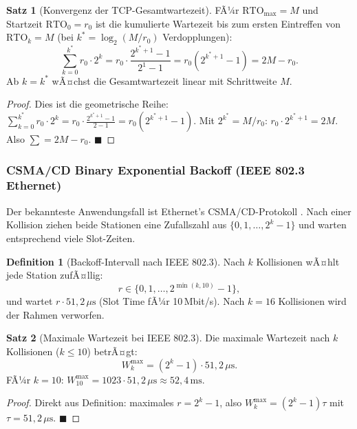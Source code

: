 ﻿\documentclass[a4paper,12pt]{article}
\theoremstyle{definition}
\newtheorem{definition}{Definition}
\newtheorem{satz}{Satz}
\begin{document}
\begin{satz}[Konvergenz der TCP-Gesamtwartezeit]
\label{satz:tcp_konvergenz}
FÃ¼r $\mathrm{RTO}_{\max} = M$ und Startzeit $\mathrm{RTO}_0 = r_0$
ist die kumulierte Wartezeit bis zum ersten Eintreffen von
$\mathrm{RTO}_k = M$ (bei $k^* = \log_2(M/r_0)$ Verdopplungen):
\[
  \sum_{k=0}^{k^*} r_0 \cdot 2^k
  = r_0 \cdot \frac{2^{k^*+1}-1}{2^1 - 1}
  = r_0(2^{k^*+1}-1)
  = 2M - r_0.
\]
Ab $k = k^*$ wÃ¤chst die Gesamtwartezeit linear mit Schrittweite $M$.
\end{satz}

\begin{proof}
Dies ist die geometrische Reihe:
$\sum_{k=0}^{k^*} r_0 \cdot 2^k = r_0 \cdot \frac{2^{k^*+1}-1}{2-1}
= r_0(2^{k^*+1}-1)$.
Mit $2^{k^*} = M/r_0$: $r_0 \cdot 2^{k^*+1} = 2M$.
Also $\sum = 2M - r_0$.
\hfill$\blacksquare$
\end{proof}

\subsubsection{CSMA/CD Binary Exponential Backoff (IEEE 802.3 Ethernet)}

Der bekannteste Anwendungsfall ist Ethernet's CSMA/CD-Protokoll
\cite{metcalfe1976ethernet}. Nach einer Kollision ziehen beide
Stationen eine Zufallszahl aus $\{0, 1, \ldots, 2^k-1\}$ und warten
entsprechend viele Slot-Zeiten.

\begin{definition}[Backoff-Intervall nach IEEE 802.3]
Nach $k$ Kollisionen wÃ¤hlt jede Station zufÃ¤llig:
\[
  r \in \{0, 1, \ldots, 2^{\min(k,10)}-1\},
\]
und wartet $r \cdot 51{,}2\,\mu\mathrm{s}$ (Slot Time fÃ¼r 10\,Mbit/s).
Nach $k = 16$ Kollisionen wird der Rahmen verworfen.
\end{definition}

\begin{satz}[Maximale Wartezeit bei IEEE 802.3]
\label{satz:max_ethernet}
Die maximale Wartezeit nach $k$ Kollisionen ($k \leq 10$) betrÃ¤gt:
\[
  W_k^{\max} = (2^k - 1) \cdot 51{,}2\,\mu\mathrm{s}.
\]
FÃ¼r $k = 10$: $W_{10}^{\max} = 1023 \cdot 51{,}2\,\mu\mathrm{s}
\approx 52{,}4\,\mathrm{ms}$.
\end{satz}

\begin{proof}
Direkt aus Definition: maximales $r = 2^k - 1$,
also $W_k^{\max} = (2^k-1)\tau$ mit $\tau = 51{,}2\,\mu\mathrm{s}$.
\hfill$\blacksquare$
\end{proof}
\end{document}
